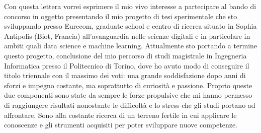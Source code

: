 \documentclass[11pt, a4paper]{awesome-cv}
\begin{document}
\makecvheader[L]


\makelettertitle

\begin{cvletter}

Con questa lettera vorrei esprimere il mio vivo interesse a partecipare al bando di concorso in oggetto presentando il mio progetto di tesi sperimentale che sto sviluppando presso Eurecom, graduate school e centro di ricerca situato in Sophia Antipolis (Biot, Francia) all'avanguardia nelle scienze digitali e in particolare in ambiti quali data science e machine learning. 
Attualmente sto portando a termine questo progetto, conclusione del mio percorso di studi magistrale in Ingegneria Informatica presso il Politecnico di Torino, dove ho avuto modo di conseguire il titolo triennale con il massimo dei voti: una grande soddisfazione dopo anni di sforzi e impegno costante, ma soprattutto di curiosità e passione.
Proprio queste due componenti sono state da sempre le forze propulsive che mi hanno permesso di raggiungere risultati nonostante le difficoltà e lo stress che gli studi portano ad affrontare. Sono alla costante ricerca di un terreno fertile in cui applicare le conoscenze e gli strumenti acquisiti per poter sviluppare nuove competenze. 


\end{cvletter}
\end{document}
